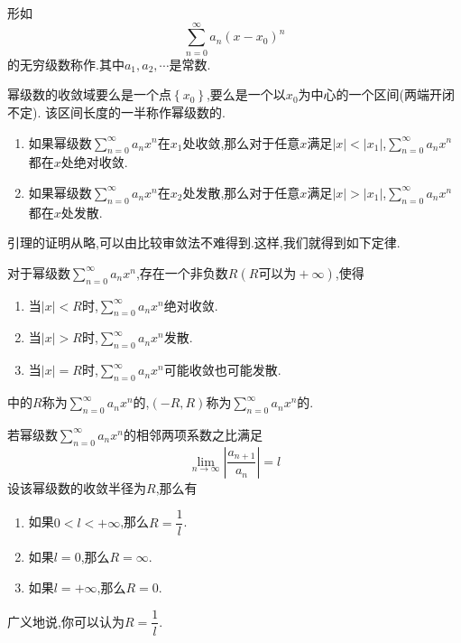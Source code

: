 \documentclass{ctexart}
\begin{document}
\pagestyle{empty}
\begin{center}\large{}\end{center}
\begin{definition}[1.1 定义:幂级数]
    形如
    \[\sum_{n=0}^\infty a_n\left(x-x_0\right)^n\]
    的无穷级数称作.其中$a_1,a_2,\cdots$是常数.
\end{definition}
\begin{formal}[1.2 幂级数的收敛半径]
    幂级数的收敛域要么是一个点$\left\{x_0\right\}$,要么是一个以$x_0$为中心的一个区间(两端开闭不定).%
    该区间长度的一半称作幂级数的.
\end{formal}
\begin{lemma}
    \begin{enumerate}[label=\tbf{\arabic*.}]
        \item 如果幂级数$\displaystyle\sum_{n=0}^\infty a_nx^n$在$x_1$处收敛,那么对于任意$x$满足$|x|<|x_1|$,$\displaystyle\sum_{n=0}^\infty a_nx^n$都在$x$处绝对收敛.
        \item 如果幂级数$\displaystyle\sum_{n=0}^\infty a_nx^n$在$x_2$处发散,那么对于任意$x$满足$|x|>|x_1|$,$\displaystyle\sum_{n=0}^\infty a_nx^n$都在$x$处发散.
    \end{enumerate}
\end{lemma}\noindent
引理的证明从略,可以由比较审敛法不难得到.这样,我们就得到如下定律.
\begin{formal}[1.3 幂级数的收敛半径]
    对于幂级数$\displaystyle\sum_{n=0}^\infty a_nx^n$,存在一个非负数$R(R\text{可以为}+\infty)$,使得
    \begin{enumerate}[label=\tbf{\arabic*.}]
        \item 当$|x|<R$时,$\displaystyle\sum_{n=0}^\infty a_nx^n$绝对收敛.
        \item 当$|x|>R$时,$\displaystyle\sum_{n=0}^\infty a_nx^n$发散.
        \item 当$|x|=R$时,$\displaystyle\sum_{n=0}^\infty a_nx^n$可能收敛也可能发散.
    \end{enumerate}
\end{formal}
\begin{definition}[1.4 幂级数的收敛半径与收敛区间]
    中的$R$称为$\displaystyle\sum_{n=0}^\infty a_nx^n$的,$(-R,R)$称为$\displaystyle\sum_{n=0}^\infty a_nx^n$的.
\end{definition}\noindent
{}
\begin{formal}
    若幂级数$\displaystyle\sum_{n=0}^\infty a_nx^n$的相邻两项系数之比满足
    \[\lim_{n\to\infty}\left|\dfrac{a_{n+1}}{a_n}\right|=l\]
    设该幂级数的收敛半径为$R$,那么有
    \begin{enumerate}[label=\tbf{\arabic*.}]
        \item 如果$0<l<+\infty$,那么$R=\dfrac1l$.
        \item 如果$l=0$,那么$R=\infty$.
        \item 如果$l=+\infty$,那么$R=0$.
    \end{enumerate}
    广义地说,你可以认为$R=\dfrac1l$.
\end{formal}
\end{document}
